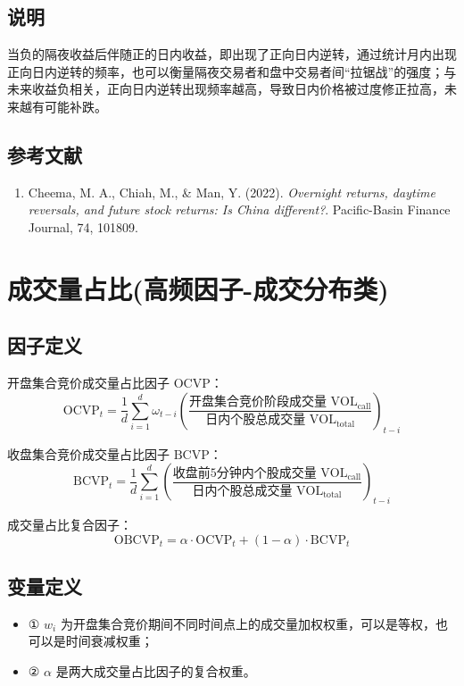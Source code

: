 \documentclass{article}
\begin{document}
\subsection{说明}
当负的隔夜收益后伴随正的日内收益，即出现了正向日内逆转，通过统计月内出现正向日内逆转的频率，也可以衡量隔夜交易者和盘中交易者间“拉锯战”的强度；与未来收益负相关，正向日内逆转出现频率越高，导致日内价格被过度修正拉高，未来越有可能补跌。

\subsection{参考文献}
\begin{enumerate}
    \item Cheema, M. A., Chiah, M., \& Man, Y. (2022). \textit{Overnight returns, daytime reversals, and future stock returns: Is China different?}. Pacific-Basin Finance Journal, 74, 101809.
\end{enumerate}

\section{成交量占比(高频因子-成交分布类)}

\subsection{因子定义}
开盘集合竞价成交量占比因子 \( \mathrm{OCVP} \)：
\begin{equation}
    \mathrm{OCVP}_t = \frac{1}{d} \sum_{i=1}^{d} \omega_{t-i}\left( \frac{\text{开盘集合竞价阶段成交量 } \mathrm{VOL}_{\mathrm{call}}}{\text{日内个股总成交量 } \mathrm{VOL}_{\mathrm{total}}} \right)_{t-i}
\end{equation}

收盘集合竞价成交量占比因子 \( \mathrm{BCVP} \)：
\begin{equation}
    \mathrm{BCVP}_t = \frac{1}{d} \sum_{i=1}^{d} \left( \frac{\text{收盘前5分钟内个股成交量 } \mathrm{VOL}_{\mathrm{call}}}{\text{日内个股总成交量 } \mathrm{VOL}_{\mathrm{total}}} \right)_{t-i}
\end{equation}

成交量占比复合因子：
\begin{equation}
    \mathrm{OBCVP}_t = \alpha \cdot \mathrm{OCVP}_t + (1 - \alpha) \cdot \mathrm{BCVP}_t
\end{equation}

\subsection{变量定义}
\begin{itemize}
    \item ① \( w_i \) 为开盘集合竞价期间不同时间点上的成交量加权权重，可以是等权，也可以是时间衰减权重；
    \item ② \( \alpha \) 是两大成交量占比因子的复合权重。
\end{itemize}
\end{document}
